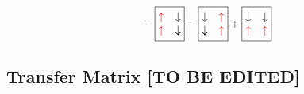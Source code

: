 \documentclass[prl,aps,twocolumn,showpacs,superscriptaddress,longbibliography]{revtex4-1}
\begin{document}
\begin{eqnarray}
{}
-
\boxed{
\begin{matrix}
  {\color{red} \uparrow} & \downarrow \\
  {\color{red} \uparrow} & \downarrow
 \end{matrix}
}
-
\boxed{
\begin{matrix}
  \downarrow & {\color{red} \uparrow} \\
  \downarrow & {\color{red} \uparrow}
 \end{matrix}
}
+
\boxed{
\begin{matrix}
  \downarrow & \downarrow \\
  {\color{red} \uparrow} & {\color{red} \uparrow}
 \end{matrix}
} \nonumber \\
%
\label{eq:preparation}
\end{eqnarray}



\subsection{Transfer Matrix [TO BE EDITED]}
\end{document}
